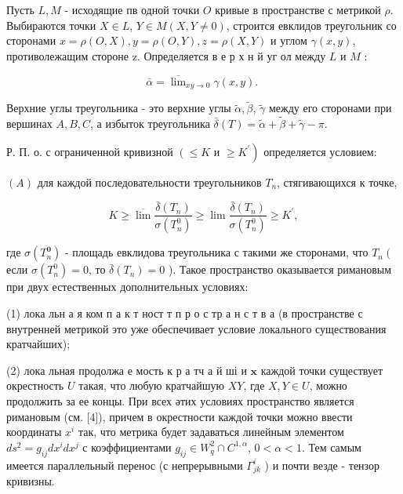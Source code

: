 \documentclass[10pt]{article}
\begin{document}
Пусть $L, M$ - исходящие пв одной точки $O$ кривые в пространстве с метрикой $\rho$. Выбираются точки $X \in L$, $Y \in M(X, Y \neq 0)$, строится евклидов треугольник со сторонами $x=\rho(O, X), y=\rho(O, Y), z=\rho(X, Y)$ и углом $\gamma(x, y)$, противолежащим стороне z. Определяется в е р х н й уг ол между $L$ и $M$ :



\[

\bar{\alpha}=\overline{\lim }_{x y \rightarrow 0} \gamma(x, y) \text {. }

\]



Верхние углы треугольника - это верхние углы $\tilde{\alpha}, \tilde{\beta}$, $\tilde{\gamma}$ между его сторонами при вершинах $A, B, C$, а избыток треугольника $\bar{\delta}(T)=\tilde{\alpha}+\tilde{\beta}+\tilde{\gamma}-\pi$.



Р. П. о. с ограниченной кривизной $\left(\leqslant K\right.$ и $\left.\geqslant K^{\prime}\right)$ определяется условием:



$(A)$ для каждой последовательности треугольников $T_{n}$, стягивающихся к точке,



\[

K \geqslant \overline{\lim } \frac{\bar{\delta}\left(T_{n}\right)}{\sigma\left(T_{n}^{0}\right)} \geqslant \lim \frac{\bar{\delta}\left(T_{n}\right)}{\sigma\left(T_{n}^{0}\right)} \geqslant K^{\prime},

\]



где $\sigma\left(T_{n}^{\mathbf{0}}\right)$ - площадь евклидова треугольника с такими же сторонами, что $T_{n}\left(\right.$ если $\sigma\left(T_{n}^{0}\right)=0$, то $\bar{\delta}\left(T_{n}\right)=0$ ). Такое пространство оказывается римановым при двух естественных дополнительных условиях:



(1) лока льн а я ком п а к т ност т п р о с тр а н с т в а (в пространстве с внутренней метрикой это уже обеспечивает условие локального существования кратчайших);



(2) лока льная продолжа е мость к р а тч а й ші и $\mathbf{x}$ каждой точки существует окрестность $U$ такая, что любую кратчайшую $X Y$, где $X, Y \in U$, можно продолжить за ее концы. При всех әтих условиях пространство является римановым (см. [4]), причем в окрестности каждой точки можно ввести координаты $x^{i}$ так, что метрика будет задаваться линейным элементом $d s^{2}=g_{i j} d x^{i} d x^{j}$ с коэффициентами $g_{i j} \in W_{q}^{2} \cap C^{1, \alpha}$, $0<\alpha<1$. Тем самым имеется параллельный перенос (с непрерывными $\Gamma_{j k}^{i}$ ) и почти везде - тензор кривизны.
\end{document}
